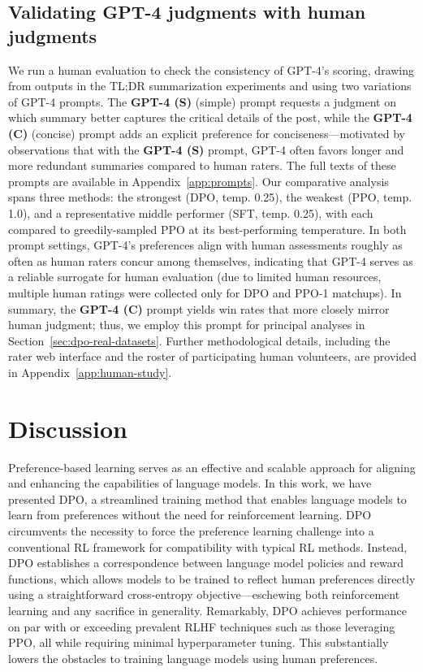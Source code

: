 \subsection{Validating GPT-4 judgments with human judgments}
\label{sec:human-judgments}
We run a human evaluation to check the consistency of GPT-4's scoring, drawing from outputs in the TL;DR summarization experiments and using two variations of GPT-4 prompts. The \textbf{GPT-4 (S)} (simple) prompt requests a judgment on which summary better captures the critical details of the post, while the \textbf{GPT-4 (C)} (concise) prompt adds an explicit preference for conciseness—motivated by observations that with the \textbf{GPT-4 (S)} prompt, GPT-4 often favors longer and more redundant summaries compared to human raters. The full texts of these prompts are available in Appendix~\ref{app:prompts}. Our comparative analysis spans three methods: the strongest (DPO, temp. 0.25), the weakest (PPO, temp. 1.0), and a representative middle performer (SFT, temp. 0.25), with each compared to greedily-sampled PPO at its best-performing temperature. In both prompt settings, GPT-4's preferences align with human assessments roughly as often as human raters concur among themselves, indicating that GPT-4 serves as a reliable surrogate for human evaluation (due to limited human resources, multiple human ratings were collected only for DPO and PPO-1 matchups). In summary, the \textbf{GPT-4 (C)} prompt yields win rates that more closely mirror human judgment; thus, we employ this prompt for principal analyses in Section~\ref{sec:dpo-real-datasets}. Further methodological details, including the rater web interface and the roster of participating human volunteers, are provided in Appendix~\ref{app:human-study}.

\section{Discussion}
Preference-based learning serves as an effective and scalable approach for aligning and enhancing the capabilities of language models. In this work, we have presented DPO, a streamlined training method that enables language models to learn from preferences without the need for reinforcement learning. DPO circumvents the necessity to force the preference learning challenge into a conventional RL framework for compatibility with typical RL methods. Instead, DPO establishes a correspondence between language model policies and reward functions, which allows models to be trained to reflect human preferences directly using a straightforward cross-entropy objective—eschewing both reinforcement learning and any sacrifice in generality. Remarkably, DPO achieves performance on par with or exceeding prevalent RLHF techniques such as those leveraging PPO, all while requiring minimal hyperparameter tuning. This substantially lowers the obstacles to training language models using human preferences.

